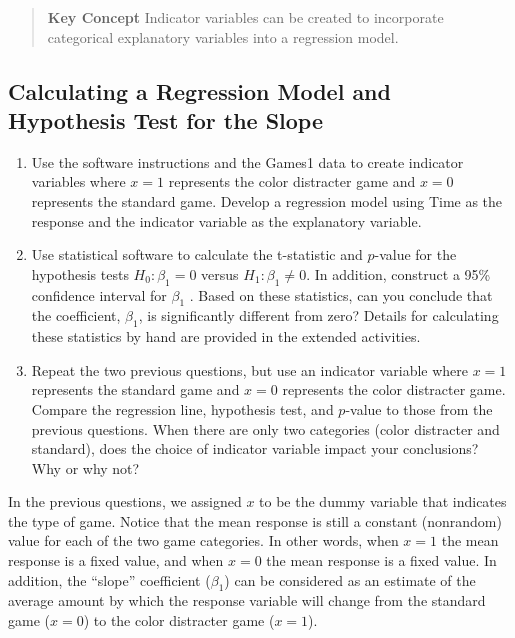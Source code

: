 \documentclass[
]{report}
\begin{document}
\begin{quote}
\textbf{Key Concept}
Indicator variables can be created to incorporate categorical explanatory variables into a regression model.
\end{quote}

\subsection*{Calculating a Regression Model and Hypothesis Test for the Slope}\label{calculating-a-regression-model-and-hypothesis-test-for-the-slope}

\begin{enumerate}
\def\labelenumi{\arabic{enumi}.}
\setcounter{enumi}{10}
\item
  Use the software instructions and the Games1 data to create indicator variables where \(x = 1\) represents the color distracter game and \(x = 0\) represents the standard game. Develop a regression model using Time as the response and the indicator variable as the explanatory variable.
\item
  Use statistical software to calculate the t-statistic and \(p\)-value for the hypothesis tests \(H_0 : \beta_1 = 0\) versus \(H_1 : \beta_1 \ne 0\). In addition, construct a 95\% confidence interval for \(\beta_1\) . Based on these statistics, can you conclude that the coefficient, \(\beta_1\), is significantly different from zero? Details for calculating these statistics by hand are provided in the extended activities.
\item
  Repeat the two previous questions, but use an indicator variable where \(x = 1\) represents the standard game and \(x = 0\) represents the color distracter game. Compare the regression line, hypothesis test, and \(p\)-value to those from the previous questions. When there are only two categories (color distracter and standard), does the choice of indicator variable impact your conclusions? Why or why not?
\end{enumerate}

In the previous questions, we assigned \(x\) to be the dummy variable that indicates the type of game. Notice that the mean response is still a constant (nonrandom) value for each of the two game categories. In other
words, when \(x = 1\) the mean response is a fixed value, and when \(x = 0\) the mean response is a fixed value. In addition, the ``slope'' coefficient (\(\beta_1\)) can be considered as an estimate of the average amount by which the response variable will change from the standard game (\(x = 0\)) to the color distracter game (\(x = 1\)).
\end{document}
